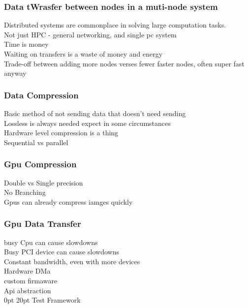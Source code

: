 \documentclass[12pt,a4paper]{article}
\makeatletter
\renewcommand\section{\@startsection {section}{1}{0mm} %
                               {0pt} %
                               {20pt} %
                               {\fontsize{14pt}{1em}\bfseries\newpage}}
\makeatother
\begin{document}
	\subsubsection{Data tWrasfer between nodes in a muti-node system}
		Distributed systems are commonplace in solving large computation tasks.\\
		Not just HPC - general networking, and single pc system\\
		Time is money\\
		Waiting on transfers is a waste of money and energy\\
		Trade-off between adding more nodes verses fewer faster nodes, often super fast anyway\\
	\subsubsection{Data Compression}
		Basic method of not sending data that doesn't need sending \\
		Lossless is always needed expect in some circumstances\\
		Hardware level compression is a thing\\
		Sequential vs parallel\\
	\subsubsection{Gpu Compression}
		Double vs Single precision \\
		No Branching \\
		Gpus can already compress iamges quickly\\
	
	\subsubsection{Gpu Data Transfer}
		busy Cpu can cause slowdowns\\
		Busy PCI device can cause slowdowns\\
		Constant bandwidth, even with more devices\\
		Hardware DMa\\
		custom firmaware\\
		Api abstraction\\

\section{Test Framework}
\end{document}
